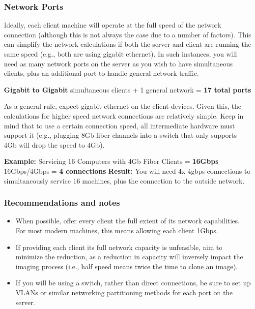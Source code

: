 \documentclass{article}
\begin{document}
\subsubsection{Network Ports}
Ideally, each client machine will operate at the full speed of the network connection (although this is not always the case due to a number of factors).  This can simplify the network calculations if both the server and client are running the same speed (e.g., both are using gigabit ethernet).  In such instances, you will need as many network ports on the server as you wish to have simultaneous clients, plus an additional port to handle general network traffic.
\begin{center}
  \textbf{Gigabit to Gigabit} simultaneous clients + 1 general network = \textbf{17 total ports}
\end{center}
As a general rule, expect gigabit ethernet on the client devices.  Given this, the calculations for higher speed network connections are relatively simple.  Keep in mind that to use a certain connection speed, all intermediate hardware must support it (e.g., plugging 8Gb fiber channels into a switch that only supports 4Gb will drop the speed to 4Gb).
\begin{center}
  \textbf{Example:} Servicing 16 Computers with 4Gb Fiber Clients = \textbf{16Gbps}\linebreak
  16Gbps/4Gbps = \textbf{4 connections}\linebreak
  \textbf{Result:} You will need 4x 4gbps connections to simultaneously service 16 machines, plus the connection to the outside network.
\end{center}
\subsubsection{Recommendations and notes}
\begin{itemize}
  \item When possible, offer every client the full extent of its network capabilities.  For most modern machines, this means allowing each client 1Gbps.
  \item If providing each client its full network capacity is unfeasible, aim to minimize the reduction, as a reduction in capacity will inversely impact the imaging process (i.e., half speed means twice the time to clone an image).
  \item If you will be using a switch, rather than direct connections, be sure to set up VLANs or similar networking partitioning methods for each port on the server.
\end{itemize}
\end{document}
